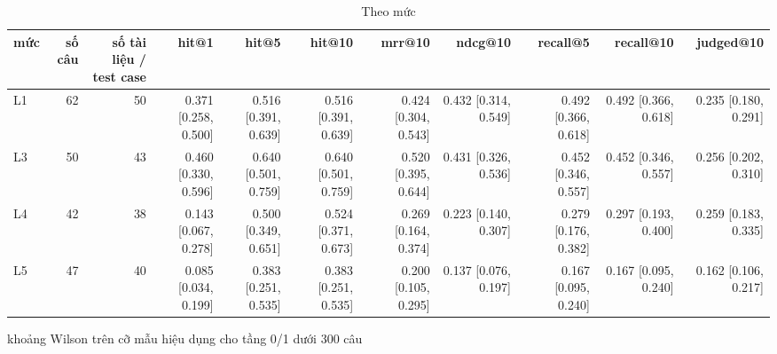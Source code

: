 \begin{table}[ht]
\centering
\caption{Theo mức}
\begin{tabular}{lrrrrrrrrrr}
\toprule
mức & số câu & số tài liệu / test case & hit@1 & hit@5 & hit@10 & mrr@10 & ndcg@10 & recall@5 & recall@10 & judged@10 \\
\midrule
L1 & 62 & 50 & 0.371 [0.258, 0.500] & 0.516 [0.391, 0.639] & 0.516 [0.391, 0.639] & 0.424 [0.304, 0.543] & 0.432 [0.314, 0.549] & 0.492 [0.366, 0.618] & 0.492 [0.366, 0.618] & 0.235 [0.180, 0.291] \\
L3 & 50 & 43 & 0.460 [0.330, 0.596] & 0.640 [0.501, 0.759] & 0.640 [0.501, 0.759] & 0.520 [0.395, 0.644] & 0.431 [0.326, 0.536] & 0.452 [0.346, 0.557] & 0.452 [0.346, 0.557] & 0.256 [0.202, 0.310] \\
L4 & 42 & 38 & 0.143 [0.067, 0.278] & 0.500 [0.349, 0.651] & 0.524 [0.371, 0.673] & 0.269 [0.164, 0.374] & 0.223 [0.140, 0.307] & 0.279 [0.176, 0.382] & 0.297 [0.193, 0.400] & 0.259 [0.183, 0.335] \\
L5 & 47 & 40 & 0.085 [0.034, 0.199] & 0.383 [0.251, 0.535] & 0.383 [0.251, 0.535] & 0.200 [0.105, 0.295] & 0.137 [0.076, 0.197] & 0.167 [0.095, 0.240] & 0.167 [0.095, 0.240] & 0.162 [0.106, 0.217] \\
\bottomrule
\end{tabular}
\par\smallskip\footnotesize khoảng Wilson trên cỡ mẫu hiệu dụng cho tầng 0/1 dưới 300 câu
\end{table}

